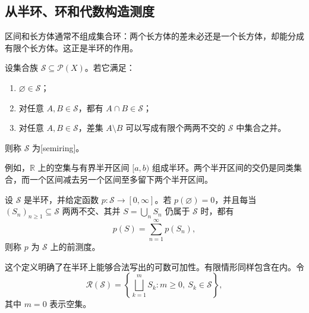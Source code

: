 \subsection{从半环、环和代数构造测度}
\label{b1:subsec:020405}

区间和长方体通常不组成集合环：两个长方体的差未必还是一个长方体，却能分成有限个长方体。这正是半环的作用。

\begin{definition}
\label{b1:def:semiring}
设集合族 \(\mathcal S\subseteq\mathcal P(X)\)。若它满足：
\begin{enumerate}
  \item\label{b1:item:semiring-empty} \(\varnothing\in\mathcal S\)；
  \item\label{b1:item:semiring-intersection} 对任意 \(A,B\in\mathcal S\)，都有 \(A\cap B\in\mathcal S\)；
  \item\label{b1:item:semiring-difference} 对任意 \(A,B\in\mathcal S\)，差集 \(A\setminus B\) 可以写成有限个两两不交的 \(\mathcal S\) 中集合之并。
\end{enumerate}
则称 \(\mathcal S\) 为[semiring]。
\end{definition}

例如，\(\mathbb R\) 上的空集与有界半开区间 \([a,b)\) 组成半环。两个半开区间的交仍是同类集合，而一个区间减去另一个区间至多留下两个半开区间。

\begin{definition}
\label{b1:def:semiring-premeasure}
设 \(\mathcal S\) 是半环，并给定函数 \(p:\mathcal S\to[0,\infty]\)。若 \(p(\varnothing)=0\)，并且每当 \((S_n)_{n\geq1}\subseteq\mathcal S\) 两两不交、其并 \(S=\bigcup_nS_n\) 仍属于 \(\mathcal S\) 时，都有
\[
p(S)=\sum_{n=1}^{\infty}p(S_n),
\]
则称 \(p\) 为 \(\mathcal S\) 上的前测度。
\end{definition}

这个定义明确了在半环上能够合法写出的可数可加性。有限情形同样包含在内。令
\[
\mathcal R(\mathcal S)
=\left\{\bigsqcup_{k=1}^{m}S_k:m\geq0,\ S_k\in\mathcal S\right\},
\]
其中 \(m=0\) 表示空集。

